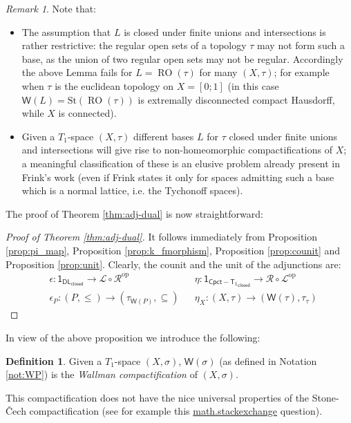 \documentclass{article}
\newcommand{\corn}[1]{(\mathsf{W}(#1),\tau_{#1})}
\theoremstyle{plain}
\theoremstyle{definition}
\newtheorem{definition}[theorem]{Definition}
\theoremstyle{remark}
\newtheorem{remark}[theorem]{Remark}
\DeclareMathOperator{\RO}{RO}
\newcommand{\bool}[1]{\mathsf{#1}}
\newcommand{\0}{\mathbbm 0}
\newcommand{\1}{\mathbbm 1}
\newcommand{\2}{\mathbbm 2}
\begin{document}
\begin{remark}
Note that:
\begin{itemize}
\item 
The assumption that $L$ is closed under finite unions and intersections is rather restrictive: the regular open sets of a topology $\tau$ may not form such a base, as the union of two regular open sets may not be regular. Accordingly the above Lemma fails for $L=\RO(\tau)$ for many $(X,\tau)$; for example when $\tau$ is the euclidean topology on $X=[0;1]$ (in this case $\bool{W}(L)=\mathrm{St}(\RO(\tau))$ is extremally disconnected compact Hausdorff, while $X$ is connected).
\item
Given a $T_1$-space $(X,\tau)$ different bases $L$ for $\tau$ closed under finite unions and intersections will give rise to non-homeomorphic compactifications of $X$; a meaningful classification of these is an elusive problem already present in Frink's work \cite{frink} (even if Frink states it only for spaces admitting such a base which is  a normal lattice, i.e. the Tychonoff spaces). 
\end{itemize}
\end{remark}
   The proof of Theorem \ref{thm:adj-dual} is now straightforward:
    
    \begin{proof}[Proof of Theorem \ref{thm:adj-dual}] It follows immediately from 
 Proposition \ref{prop:pi_map}, Proposition \ref{prop:k_fmorphism},   Proposition \ref{prop:counit} and Proposition \ref{prop:unit}. Clearly, the counit and the unit of the adjunctions are: 
    \begin{align*}
         &\epsilon:  \bool{1}_{\bool{DL}_\bool{closed} }  \to \mathcal{L} \circ \mathcal{R^\mathrm{op}} & &\eta: \bool{1}_{\bool{Cpct-T_1}_{\bool{closed}} }\to \mathcal{R} \circ \mathcal{L^\mathrm{op}}  \\
             &\epsilon_P:(P, \leq) \to (\tau_{\mathsf{W}(P)}, \subseteq) & &\eta_X:  (X, \tau) \to \corn{\tau}
    \end{align*}         
\end{proof}
In view of the above proposition we introduce the following:

\begin{definition}
Given a $T_1$-space $(X,\sigma)$,
$\bool{W}(\sigma)$ (as defined in Notation \ref{not:WP}) is the \emph{Wallman compactification} of $(X,\sigma)$.
\end{definition}

This compactification does not have the nice universal properties of the Stone-\v{C}ech compactification (see for example this \href{https://math.stackexchange.com/questions/3892507/what-happens-to-the-stone-cech-compactification-if-you-change-compact-hausdorff/3892815#3892815}{math.stackexchange} question). 
\end{document}
